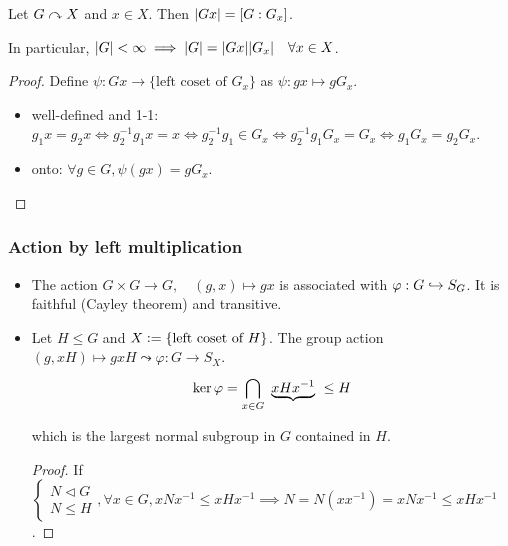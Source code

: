 \begin{prop}
  Let $G \curvearrowright X$ and $x \in X$. Then $\lvert Gx\rvert = [G : G_x]$.

  In particular, $\lvert G\rvert < \infty \implies \lvert G\rvert = \lvert Gx\rvert\lvert G_x\rvert
  \quad \forall x \in X$.
  \begin{proof}
    Define $\psi: Gx \to \{ \text{left coset of~} G_x \}$ as
    $\psi: gx \mapsto g G_x$.
    \begin{itemize}
      \item well-defined and 1-1:
        $g_1x = g_2x \iff g_2^{-1}g_1x = x \iff g_2^{-1}g_1 \in G_x \iff
        g_2^{-1}g_1G_x = G_x \iff g_1G_x = g_2G_x$.
      \item onto: $\forall g \in G, \psi(gx) = gG_x$. \qedhere
    \end{itemize}
  \end{proof}
\end{prop}

\subsubsection{Action by left multiplication}
\begin{itemize}
  \item The action $G \times G \to G, \quad (g, x) \mapsto gx$ is associated
    with $\varphi: G \hookrightarrow S_G$.
    It is faithful (Cayley theorem) and transitive.
  \item Let $H \le G$ and $X \vcentcolon= \{ \text{left coset of~} H \}$.
    The group action $(g, xH) \mapsto gxH \leadsto \varphi: G \to S_X$.
    \[
      \ker \varphi = \bigcap_{x \in G} \tikz[anchor=base, baseline]{
      \node (conj-of-H) {$\underbrace{xHx^{-1}}$}; } \le H
    \]
    which is the largest normal subgroup in $G$ contained in $H$.
    \begin{proof}
      If $\begin{cases} N \lhd G \\ N \le H\end{cases}, \forall x \in G,
        xNx^{-1} \le xHx^{-1} \implies N = N(xx^{-1}) = xNx^{-1} \le xHx^{-1}$.
    \end{proof}
\end{itemize}

